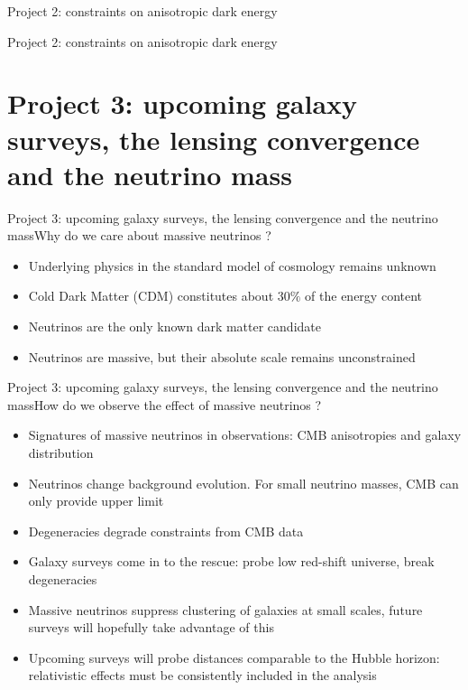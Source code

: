 \documentclass{beamer}
\begin{document}
\begin{frame}{Project 2: constraints on anisotropic dark energy}

\end{frame}

\begin{frame}{Project 2: constraints on anisotropic dark energy}

\end{frame}

\section*{Project 3: upcoming galaxy surveys, the lensing convergence and the neutrino mass}

\begin{frame}{Project 3: upcoming galaxy surveys, the lensing convergence and the neutrino mass}{Why do we care about massive neutrinos ?}
\begin{itemize}
\item Underlying physics in the standard model of cosmology remains unknown
\item Cold Dark Matter (CDM) constitutes  about $30\%$ of the energy content
\item Neutrinos are the only known dark matter candidate
\item Neutrinos are massive, but their absolute scale remains unconstrained
\end{itemize}
\end{frame}

\begin{frame}{Project 3: upcoming galaxy surveys, the lensing convergence and the neutrino mass}{How do we observe the effect of massive neutrinos ?}
\begin{itemize}
\item Signatures of massive neutrinos in observations: CMB anisotropies and galaxy distribution
\item Neutrinos change background evolution. For small neutrino masses, CMB can only provide upper limit 
\item Degeneracies degrade constraints from CMB data
\item Galaxy surveys come in to the rescue: probe low red-shift universe, break degeneracies
\item Massive neutrinos suppress clustering of galaxies at small scales, future surveys will hopefully take advantage of this
\item Upcoming surveys will probe distances comparable to the Hubble horizon: relativistic effects must be consistently included in the analysis
\end{itemize}

\end{frame}
\end{document}
